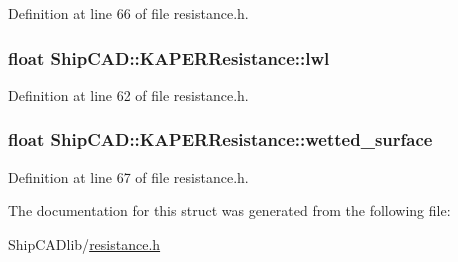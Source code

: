 Definition at line 66 of file resistance.\-h.

\hypertarget{structShipCAD_1_1KAPERResistance_a1c2aa0aa33bf7770cd531f1d1ea8b809}{
\subsubsection[{lwl}]{\setlength{\rightskip}{0pt plus 5cm}float Ship\-C\-A\-D\-::\-K\-A\-P\-E\-R\-Resistance\-::lwl}}\label{structShipCAD_1_1KAPERResistance_a1c2aa0aa33bf7770cd531f1d1ea8b809}


Definition at line 62 of file resistance.\-h.

\hypertarget{structShipCAD_1_1KAPERResistance_a912090d77ad755a5b1506372c24540bc}{
\subsubsection[{wetted\-\_\-surface}]{\setlength{\rightskip}{0pt plus 5cm}float Ship\-C\-A\-D\-::\-K\-A\-P\-E\-R\-Resistance\-::wetted\-\_\-surface}}\label{structShipCAD_1_1KAPERResistance_a912090d77ad755a5b1506372c24540bc}


Definition at line 67 of file resistance.\-h.



The documentation for this struct was generated from the following file\-:\begin{DoxyCompactItemize}
\item 
Ship\-C\-A\-Dlib/\hyperlink{resistance_8h}{resistance.\-h}\end{DoxyCompactItemize}
